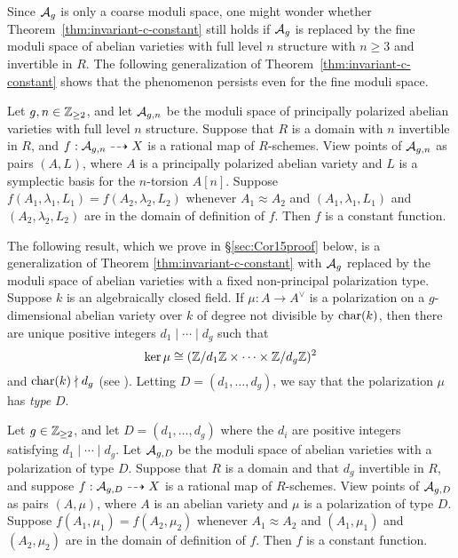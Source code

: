 \documentclass{amsart}
\begin{document}
Since $\mathcal{A}_g$ is only a coarse moduli space, one might wonder whether Theorem~\ref{thm:invariant-c-constant} still holds if $\mathcal{A}_g$  is replaced by the fine moduli space of abelian varieties with full level $n$ structure with $n\ge 3$ and invertible in $R$. The following generalization of 
Theorem~\ref{thm:invariant-c-constant} shows that the phenomenon persists even for the fine moduli space.

\begin{corollary}\label{cor:agn}
  Let $g,n \in \mathbb{Z}_{\geq 2}$, and let $\mathcal{A}_{g,n}$ be the moduli space of principally polarized abelian varieties with full level $n$ structure. Suppose that $R$ is a domain with $n$ invertible in $R$, and $f: \mathcal{A}_{g,n} \dashrightarrow X$ is a rational map of $R$-schemes. View points of $\mathcal{A}_{g,n}$ as pairs $(A,L)$, where $A$ is a principally polarized abelian variety and $L$ is a symplectic basis for the $n$-torsion $A[n]$. Suppose $f(A_1,\lambda_1, L_1) = f(A_2,\lambda_2, L_2)$ whenever $A_1 \approx A_2$ and $(A_1,\lambda_1, L_1)$ and $(A_2,\lambda_2, L_2)$ are in the domain of definition of $f$. Then $f$ is a constant function.
\end{corollary}


The following result, which we prove in \S\ref{sec:Cor15proof} below, is a generalization of Theorem \ref{thm:invariant-c-constant} with $\mathcal{A}_g$ replaced by the moduli space of  abelian varieties with a fixed non-principal polarization type. Suppose $k$ is an algebraically closed field. If $\mu: A \to A^\vee$ is a polarization on a $g$-dimensional abelian variety over $k$ of degree not divisible by $\operatorname{char}(k)$, then there are unique positive integers $d_1 \mid \cdots \mid d_g$ such that
\[
  \ker \mu \cong (\mathbb{Z}/d_1\mathbb{Z} \times \cdots \times \mathbb{Z}/d_g\mathbb{Z})^2
\]
and $\operatorname{char}(k) \nmid d_g$ (see \cite[Theorem 1 et seq.]{mumford1966}). Letting $D = (d_1, \ldots, d_g)$, we say that the polarization $\mu$ has \emph{type} $D$. 
\begin{corollary}\label{cor:agpol}
  Let $g \in \mathbb{Z}_{\geq 2}$, and let ${D} = (d_1, \ldots, d_g)$ where the $d_i$ are positive integers satisfying $d_1 \mid \cdots \mid d_g$. Let $\mathcal{A}_{g,{D}}$ be the moduli space of abelian varieties with a polarization of type ${D}$. Suppose that $R$ is a domain and that $d_g$ invertible in $R$, and suppose $f: \mathcal{A}_{g,{D}} \dashrightarrow X$ is a rational map of $R$-schemes. View points of $\mathcal{A}_{g,{D}}$ as pairs $(A,\mu)$, where $A$ is an abelian variety and $\mu$ is a polarization of type ${D}$. Suppose $f(A_1, \mu_1) = f(A_2, \mu_2)$ whenever $A_1 \approx A_2$ and $(A_1,\mu_1)$ and $(A_2,\mu_2)$ are in the domain of definition of $f$. Then $f$ is a constant function.
\end{corollary}
\end{document}
